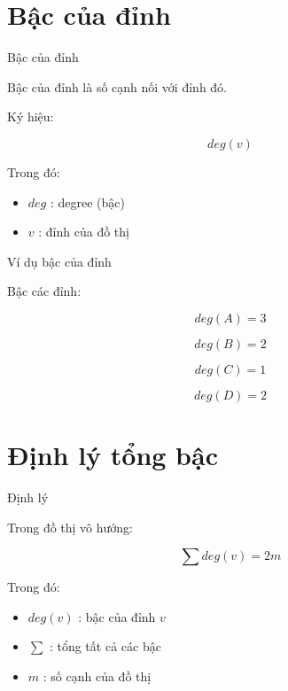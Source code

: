 \documentclass{beamer}
\begin{document}
\section{Bậc của đỉnh}

\begin{frame}{Bậc của đỉnh}

Bậc của đỉnh là số cạnh nối với đỉnh đó.

Ký hiệu:

\[
deg(v)
\]

Trong đó:

\begin{itemize}
\item $deg$ : degree (bậc)
\item $v$ : đỉnh của đồ thị
\end{itemize}

\end{frame}

\begin{frame}{Ví dụ bậc của đỉnh}

\begin{center}


\end{center}

Bậc các đỉnh:

\[
deg(A)=3
\]

\[
deg(B)=2
\]

\[
deg(C)=1
\]

\[
deg(D)=2
\]

\end{frame}

\section{Định lý tổng bậc}

\begin{frame}{Định lý}

Trong đồ thị vô hướng:

\[
\sum deg(v)=2m
\]

Trong đó:

\begin{itemize}
\item $deg(v)$ : bậc của đỉnh $v$
\item $\sum$ : tổng tất cả các bậc
\item $m$ : số cạnh của đồ thị
\end{itemize}

\end{frame}
\end{document}
